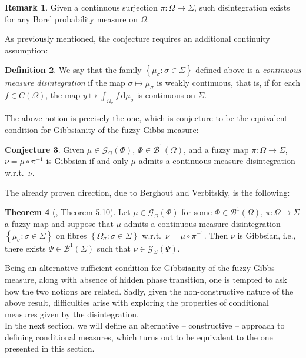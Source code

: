 \documentclass[12pt]{article}
\newcommand{\BB}{\mathscr{B}}
\renewcommand{\d}{\mathrm{d}}
\newcommand{\G}{\mathcal{G}}
\newcommand{\set}[1]{\left\{#1\right\}}
\newcommand{\ra}{\rightarrow}
\newcommand{\1}{\mathbbm{1}}
\newcommand{\5}{\vspace{0.5cm}}
\theoremstyle{definition}
\newtheorem{thm}{Theorem}[section]
\newtheorem{df}[thm]{Definition}
\newtheorem{rem}[thm]{Remark}
\newtheorem{conj}[thm]{Conjecture}
\begin{document}
\begin{rem}
Given a continuous surjection $\pi:\Omega\ra\Sigma$, such disintegration exists for any Borel probability measure on $\Omega$.
\end{rem}

As previously mentioned, the conjecture requires an additional continuity assumption:

\begin{df}
We say that the family $\set{\mu_\sigma:\sigma\in\Sigma}$ defined above is a \textit{continuous measure disintegration} if the map $\sigma\mapsto\mu_\sigma$ is weakly continuous, that is, if for each $f\in C(\Omega)$, the map $y\mapsto\int_{\Omega_\sigma}f\,\d\mu_\sigma$ is continuous on $\Sigma$.
\end{df}

The above notion is precisely the one, which is conjecture to be the equivalent condition for Gibbsianity of the fuzzy Gibbs measure:
\begin{conj}\label{vEFShypothesis}
Given $\mu\in\G_\Omega(\Phi)$, $\Phi\in\BB^1(\Omega)$, and a fuzzy map $\pi:\Omega\ra\Sigma$, $\nu=\mu\circ\pi^{-1}$ is Gibbsian if and only $\mu$ admits a continuous measure disintegration w.r.t.~$\nu$.
\end{conj}

The already proven direction, due to Berghout and Verbitskiy, is the following:
\begin{thm}[\cite{Ber}, Theorem 5.10]\label{thm:DisinImpliesGibbs}
Let $\mu\in\G_\Omega(\Phi)$ for some $\Phi\in\BB^1(\Omega)$, $\pi:\Omega\ra\Sigma$ a fuzzy map and suppose that $\mu$ admits a continuous measure disintegration $\set{\mu_\sigma:\sigma\in\Sigma}$ on fibres $\set{\Omega_\sigma:\sigma\in\Sigma}$ w.r.t.~$\nu=\mu\circ\pi^{-1}$. Then $\nu$ is Gibbsian, i.e., there exists $\Psi\in\BB^1(\Sigma)$ such that $\nu\in\G_\Sigma(\Psi)$.
\end{thm}

Being an alternative sufficient condition for Gibbsianity of the fuzzy Gibbs measure, along with absence of hidden phase transition, one is tempted to ask how the two notions are related. Sadly, given the non-constructive nature of the above result, difficulties arise with exploring the properties of conditional measures given by the disintegration. \\

In the next section, we will define an alternative -- constructive -- approach to defining conditional measures, which turns out to be equivalent to the one presented in this section.
\end{document}

